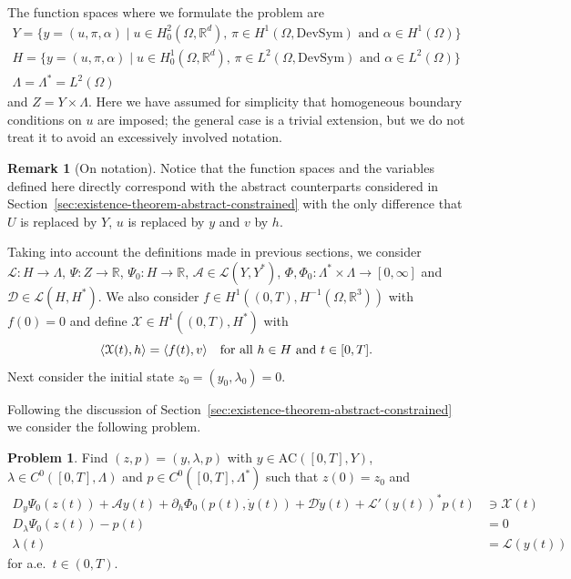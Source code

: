\documentclass[a4paper,10pt,oneside]{amsbook}
\numberwithin{section}{chapter}
\numberwithin{equation}{chapter}
\theoremstyle{definition}
\newtheorem{rmk}[prop]{Remark}
\newtheorem{prb}[prop]{Problem}
\DeclarePairedDelimiter{\dual}{\langle}{\rangle}
\begin{document}
The function spaces where we formulate the problem are
\begin{gather}
Y=\{y=(u,\pi,\alpha)\;|\;\text{$u\in H^2_0(\Omega,\mathbb{R}^d)$, $\pi\in H^1(\Omega,\text{DevSym})$ and $\alpha\in H^1(\Omega)$}\} \\
H=\{y=(u,\pi,\alpha)\;|\;\text{$u\in H^1_0(\Omega,\mathbb{R}^d)$, $\pi\in L^2(\Omega,\text{DevSym})$ and $\alpha\in L^2(\Omega)$}\} \\
\Lambda=\Lambda^*=L^2(\Omega)
\end{gather}
and $Z=Y\times\Lambda$. Here we have assumed for simplicity that homogeneous boundary conditions on $u$ are imposed; the general case is a trivial extension, but we do not treat it to avoid an excessively involved notation.
\begin{rmk}[On notation]
Notice that the function spaces and the variables defined here directly correspond with the abstract counterparts considered in Section~\ref{sec:existence-theorem-abstract-constrained} with the only difference that $U$ is replaced by $Y$, $u$ is replaced by $y$ and $v$ by $h$.
\end{rmk}
Taking into account the definitions made in previous sections, we consider $\mathcal{L}\colon H\to\Lambda$, $\Psi\colon Z\to\mathbb{R}$, $\Psi_0\colon H\to\mathbb{R}$, $\mathcal{A}\in\mathscr{L}(Y,Y^*)$, $\Phi,\Phi_0\colon\Lambda^*\times\Lambda\to[0,\infty]$ and $\mathcal{D}\in\mathscr{L}(H,H^*)$. We also consider $f\in H^1((0,T),H^{-1}(\Omega,\mathbb{R}^3))$ with $f(0)=0$ and define $\mathcal{X}\in H^1((0,T),H^*)$ with
\[
\dual{\mathcal{X}(t),h}=\dual{f(t),v}\quad\text{for all $h\in H$ and $t\in[0,T]$}.
\]
Next consider the initial state $z_0=(y_0,\lambda_0)=0$.

Following the discussion of Section~\ref{sec:existence-theorem-abstract-constrained} we consider the following problem.
\begin{prb}
\label{prb:pressure-sensitive-small}
Find $(z,p)=(y,\lambda,p)$ with $y\in\text{AC}([0,T],Y)$, $\lambda\in C^0([0,T],\Lambda)$ and $p\in C^0([0,T],\Lambda^*)$ such that $z(0)=z_0$ and
\begin{align}
D_y\Psi_0(z(t))+\mathcal{A}y(t)+\partial_h\Phi_0(p(t),\dot y(t))+\mathcal{D}\dot y(t)+\mathcal{L}'(y(t))^*p(t)&\ni\mathcal{X}(t) \\
D_\lambda\Psi_0(z(t))-p(t)&=0 \\
\lambda(t)&=\mathcal{L}(y(t))
\end{align}
for a.e.\ $t\in(0,T)$.
\end{prb}
\end{document}
